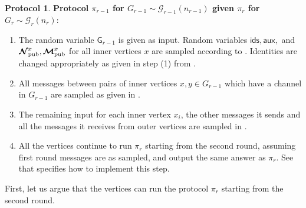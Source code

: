 \documentclass[11pt]{article}
\theoremstyle{definition}
\newtheorem{mdprotocol}{Protocol}
\newenvironment{Protocol}{\begin{tbox}\begin{mdprotocol}}{\end{mdprotocol}\end{tbox}}
\newenvironment{tbox}{\begin{tcolorbox}[
		enlarge top by=5pt,
		enlarge bottom by=5pt,
		 breakable,
		 boxsep=0pt,
                  left=4pt,
                  right=4pt,
                  top=10pt,
                  arc=4pt,
                  boxrule=1pt,toprule=1pt,
                  colback=white
                  ]%
	}
{\end{tcolorbox}}
\newcommand{\rv}[1]{\ensuremath{{\mathsf{#1}}}\xspace}
\newcounter{mybox}
\renewcommand{\themybox}{\arabic{mybox}}
\newcommand{\namethebox}{\begin{center}\textbf{Box~\themybox} \end{center}}
\newcommand{\prot}{\ensuremath{\pi}}
\newcommand{\cG}{\ensuremath{\mathcal{G}}}
\newcommand{\raux}{\ensuremath{\rv{aux}}}
\newcommand{\rNpub}[1]{\ensuremath{\bm{\mathcal{N}}_{\textnormal{pub}}^{#1}}}
\newcommand{\rMpub}[1]{\ensuremath{\bm{\mathcal{M}}_{\textnormal{pub}}^{#1}}}
\newcommand{\rG}{\ensuremath{\rv{G}}}
\newcommand{\rids}{\ensuremath{\rv{ids}}}
\begin{document}
\begin{Protocol}\label{box:r-1-final-all-steps}
\textbf{Protocol $\prot_{r-1}$ for $G_{r-1} \sim \cG_{r-1}(n_{r-1})$ given $\prot_{r}$ for $G_{r} \sim \cG_r(n_r)$}:

\begin{enumerate}[label=$(\arabic*)$]
\item The random variable $\rG_{r-1}$ is given as input. Random variables $\rids, \raux,$ and $ \rNpub{x}, \rMpub{x}$ for all inner vertices $x$ are sampled according to .  Identities are changed appropriately as given in step (1) from . 
\item All messages between pairs of inner vertices $x, y \in G_{r-1}$ which have a channel in $G_{r-1}$ are sampled as given in . 
\item The remaining input for each inner vertex $x_i$, the other messages it sends and all the messages it receives from outer vertices are sampled in .
\item All the vertices continue to run $\prot_r$ starting from the second round, assuming first round messages are as sampled, and output the same answer as $\prot_r$. 
 See  that specifies how to implement this step. 
 \end{enumerate}
\end{Protocol}

First, let us argue that the vertices can run the protocol $\prot_r$ starting from the second round. 
\end{document}
